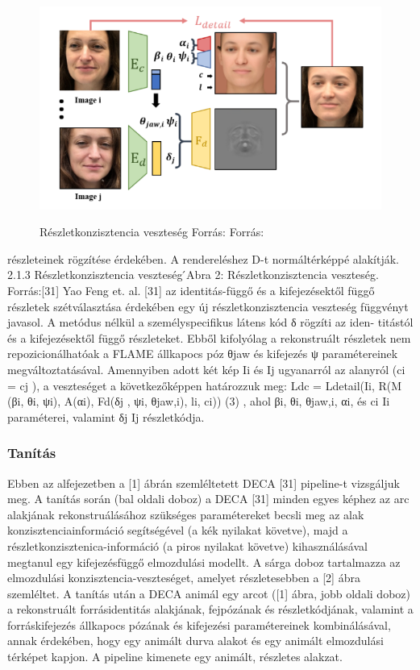 \documentclass[12pt,a4]{article}
\begin{document}
	 \begin{figure}[h]	
	 	\centering
	 	\includegraphics[width=1\linewidth]{ldetail}
	 	\label{fig:ldetail}
	 	\caption{Részletkonzisztencia veszteség Forrás: 
	 		Forrás:\cite{deca}}
	 \end{figure}
 
 	részleteinek rögzítése érdekében. A rendereléshez D-t normáltérképpé
 	alakítják.
 	2.1.3 Részletkonzisztencia veszteség
 	́Abra 2: Részletkonzisztencia veszteség. Forrás:[31]
 	Yao Feng et. al. [31] az identitás-függő és a kifejezésektől függő részletek
 	szétválasztása érdekében egy új részletkonzisztencia veszteség függvényt
 	javasol. A metódus nélkül a személyspecifikus látens kód δ rögzíti az iden-
 	titástól és a kifejezésektől függő részleteket. Ebből kifolyólag a rekonstruált
 	részletek nem repozicionálhatóak a FLAME állkapocs póz θjaw és kifejezés ψ
 	paramétereinek megváltoztatásával.
 	Amennyiben adott két kép Ii és Ij ugyanarról az alanyról (ci = cj ), a
 	veszteséget a következőképpen határozzuk meg:
 	Ldc = Ldetail(Ii, R(M (βi, θi, ψi), A(αi), Fd(δj , ψi, θjaw,i), li, ci)) (3)
 	, ahol βi, θi, θjaw,i, αi, és ci Ii paraméterei, valamint δj Ij részletkódja.
 	
 	\subsubsection{Tanítás}
 	
 	Ebben az alfejezetben a [1] ábrán szemléltetett DECA [31] pipeline-t
 	vizsgáljuk meg.
 	A tanítás során (bal oldali doboz) a DECA [31] minden egyes képhez
 	az arc alakjának rekonstruálásához szükséges paramétereket becsli meg az
 	alak konzisztenciainformáció segítségével (a kék nyilakat követve), majd
 	a részletkonzisztenica-információ (a piros nyilakat követve) kihasználásával
 	megtanul egy kifejezésfüggő elmozdulási modellt. A sárga doboz tartalmazza
 	az elmozdulási konzisztencia-veszteséget, amelyet részletesebben a [2] ábra
 	szemléltet.
 	A tanítás után a DECA animál egy arcot ([1] ábra, jobb oldali doboz)
 	a rekonstruált forrásidentitás alakjának, fejpózának és részletkódjának,
 	valamint a forráskifejezés állkapocs pózának és kifejezési paramétereinek
 	kombinálásával, annak érdekében, hogy egy animált durva alakot és egy
 	animált elmozdulási térképet kapjon. A pipeline kimenete egy animált,
 	részletes alakzat.
 	
\end{document}
